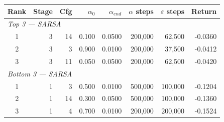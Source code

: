 \begin{tabular}{crrrrrrr}
\hline
\textbf{Rank} & \textbf{Stage} & \textbf{Cfg} & \textbf{$\alpha_0$} & \textbf{$\alpha_{end}$} & \textbf{$\alpha$ steps} & \textbf{$\varepsilon$ steps} & \textbf{Return} \\
\hline
\multicolumn{8}{l}{\textit{Top 3 — SARSA}} \\
\hline
1 & 3 & 14 & 0.100 & 0.0500 & 200,000 & 62,500 & -0.0360 \\
2 & 3 & 3 & 0.900 & 0.0100 & 200,000 & 37,500 & -0.0412 \\
3 & 3 & 11 & 0.050 & 0.0500 & 200,000 & 62,500 & -0.0420 \\
\hline
\multicolumn{8}{l}{\textit{Bottom 3 — SARSA}} \\
\hline
1 & 1 & 3 & 0.500 & 0.0100 & 500,000 & 100,000 & -0.1204 \\
2 & 1 & 14 & 0.300 & 0.0500 & 500,000 & 100,000 & -0.1360 \\
3 & 1 & 4 & 0.700 & 0.0100 & 200,000 & 200,000 & -0.1524 \\
\hline
\end{tabular}
